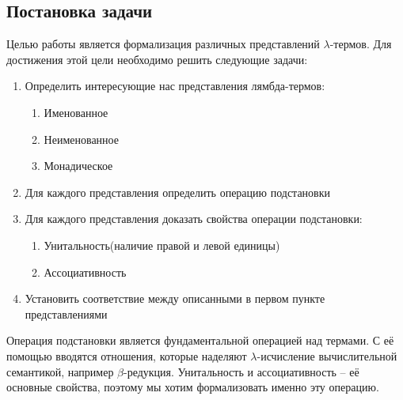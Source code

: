 \subsection{Постановка задачи}

Целью работы является формализация различных представлений $\lambda$-термов. Для достижения этой цели необходимо решить следующие задачи:

\begin{enumerate}
  \item Определить интересующие нас представления лямбда-термов:
    \begin{enumerate}
      \item Именованное
      \item Неименованное
      \item Монадическое
    \end{enumerate}
  \item Для каждого представления определить операцию подстановки
  \item Для каждого представления доказать свойства операции подстановки:
    \begin{enumerate}
      \item Унитальность(наличие правой и левой единицы)
      \item Ассоциативность
    \end{enumerate}
  \item Установить соответствие между описанными в первом пункте представлениями
\end{enumerate}

Операция подстановки является фундаментальной операцией над термами. С её помощью вводятся отношения, которые наделяют $\lambda$-исчисление вычислительной семантикой, например $\beta$-редукция. Унитальность и ассоциативность -- её основные свойства, поэтому мы хотим формализовать именно эту операцию.
